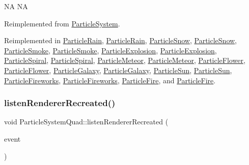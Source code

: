 NA  NA 

Reimplemented from \hyperlink{classParticleSystem_a93c417abb16ff11d24010833f9fc4b47}{Particle\+System}.



Reimplemented in \hyperlink{classParticleRain_a895dfc2e55e4dc66b927ed78dbf8ba34}{Particle\+Rain}, \hyperlink{classParticleRain_a5fa80a9b8344c32f946f16a4626d6719}{Particle\+Rain}, \hyperlink{classParticleSnow_a298dd9a158e39d502732998c55e86528}{Particle\+Snow}, \hyperlink{classParticleSnow_ab6621eb3a4940edf86739df88fc63308}{Particle\+Snow}, \hyperlink{classParticleSmoke_ad06f80d20c4f8fec1d7d56beb478b72d}{Particle\+Smoke}, \hyperlink{classParticleSmoke_a15a46a667c6fb570023fe68d94296b3e}{Particle\+Smoke}, \hyperlink{classParticleExplosion_a0264fc392403902fb6077d711533bd19}{Particle\+Explosion}, \hyperlink{classParticleExplosion_a9f9b10a10eb9591beb51ac0fd150ab36}{Particle\+Explosion}, \hyperlink{classParticleSpiral_a299f8e70bf5cafcbd4ff7defc8912a42}{Particle\+Spiral}, \hyperlink{classParticleSpiral_a49dc3c1355ebb9f008ae4693bed70f58}{Particle\+Spiral}, \hyperlink{classParticleMeteor_a4150cf7ece1830194a02a9ab45abde41}{Particle\+Meteor}, \hyperlink{classParticleMeteor_afdcabc1ed84b2161135a2854850a0143}{Particle\+Meteor}, \hyperlink{classParticleFlower_adbcd387e538bdf406a27cd94c81630f9}{Particle\+Flower}, \hyperlink{classParticleFlower_a66c7457e917237e5a8590fc84683ff1e}{Particle\+Flower}, \hyperlink{classParticleGalaxy_a13c2c56912e3b0d1fda79599bd9eb8bd}{Particle\+Galaxy}, \hyperlink{classParticleGalaxy_a4c5f713dc7e1c18d85e38cba943ee2dc}{Particle\+Galaxy}, \hyperlink{classParticleSun_a3d601303a1c2375f8ddc3e8a3306e8ae}{Particle\+Sun}, \hyperlink{classParticleSun_a59617ff3aeed92b7e5b3fe3e823c0661}{Particle\+Sun}, \hyperlink{classParticleFireworks_aed2a65f083e9ec8fd2310e38914d3906}{Particle\+Fireworks}, \hyperlink{classParticleFireworks_a3f2126134f1932867e4160f984b973fe}{Particle\+Fireworks}, \hyperlink{classParticleFire_a53432d0164422be9fb4bc1ef2394144c}{Particle\+Fire}, and \hyperlink{classParticleFire_ab4b3cbab1f857c1daa2219d47cca99c6}{Particle\+Fire}.

\mbox{\label{classParticleSystemQuad_aa133fa205fb39f435a9b46545612fd42}} 
\subsubsection{\texorpdfstring{listen\+Renderer\+Recreated()}{listenRendererRecreated()}\hspace{0.1cm}{\footnotesize\ttfamily [1/2]}}
{\footnotesize\ttfamily void Particle\+System\+Quad\+::listen\+Renderer\+Recreated (\begin{DoxyParamCaption}\item[{\hyperlink{classEventCustom}{Event\+Custom} $\ast$}]{event }\end{DoxyParamCaption})}

